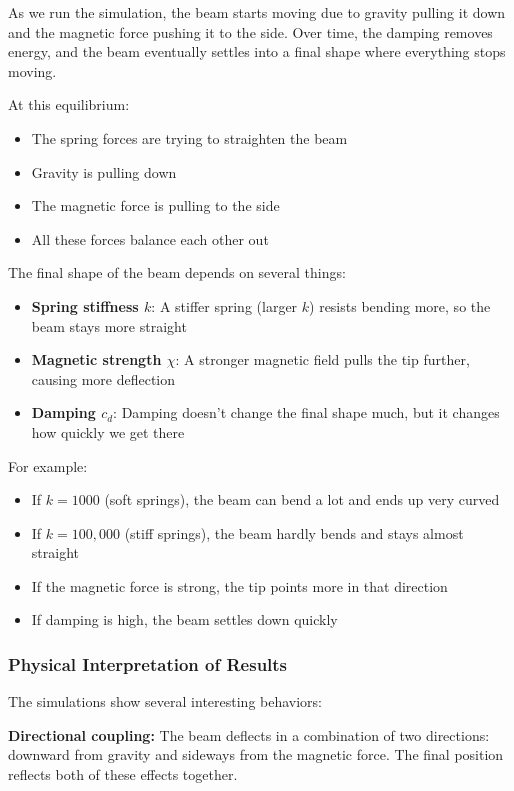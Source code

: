 \documentclass[11pt]{article}
\begin{document}
As we run the simulation, the beam starts moving due to gravity pulling it down and the magnetic force pushing it to the side. Over time, the damping removes energy, and the beam eventually settles into a final shape where everything stops moving.

At this equilibrium:
\begin{itemize}
\item The spring forces are trying to straighten the beam
\item Gravity is pulling down
\item The magnetic force is pulling to the side
\item All these forces balance each other out
\end{itemize}

The final shape of the beam depends on several things:
\begin{itemize}
\item \textbf{Spring stiffness \(k\)}: A stiffer spring (larger \(k\)) resists bending more, so the beam stays more straight
\item \textbf{Magnetic strength \(\chi\)}: A stronger magnetic field pulls the tip further, causing more deflection
\item \textbf{Damping \(c_d\)}: Damping doesn't change the final shape much, but it changes how quickly we get there
\end{itemize}

For example:
\begin{itemize}
\item If \(k = 1000\) (soft springs), the beam can bend a lot and ends up very curved
\item If \(k = 100,000\) (stiff springs), the beam hardly bends and stays almost straight
\item If the magnetic force is strong, the tip points more in that direction
\item If damping is high, the beam settles down quickly
\end{itemize}
\subsubsection{Physical Interpretation of Results}
\label{sec:org554162b}

The simulations show several interesting behaviors:

\textbf{Directional coupling:}
The beam deflects in a combination of two directions: downward from gravity and sideways from the magnetic force. The final position reflects both of these effects together.
\end{document}
